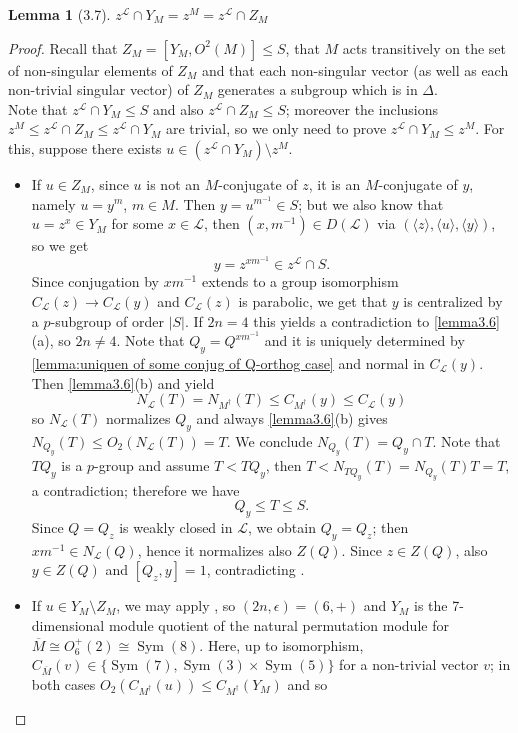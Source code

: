 \documentclass{amsart}
\numberwithin{equation}{section}
\newtheorem{lemma}[equation]{Lemma}
\theoremstyle{definition}
\theoremstyle{subresult}
\theoremstyle{caseresult}
\renewcommand{\L}{\mathcal{L}}
\newcommand{\Sym}{\operatorname{Sym}}
\newcommand{\ov}{\overline}
\newcommand{\inv}{^{-1}}
\newcommand{\fto}{\longrightarrow}
\newcommand{\<}{\langle}
\renewcommand{\>}{\rangle}
\begin{document}
\begin{lemma}[3.7]\label{lemma3.7}
	$z^\L \cap Y_M = z^M = z^\L \cap Z_M$
\end{lemma}
\begin{proof}
	Recall that $Z_M=[Y_M,O^2(M)] \le S$, that $M$ acts transitively on the set of non-singular elements of $Z_M$ and that each non-singular vector (as well as each non-trivial singular vector) of $Z_M$ generates a subgroup which is in $\Delta$.\\
	Note that $z^\L \cap Y_M \le S$ and also $z^\L \cap Z_M \le S$; moreover the inclusions $z^M \le z^\L \cap Z_M \le z^\L \cap Y_M$ are trivial, so we only need to prove $z^\L \cap Y_M \le z^M$. For this, suppose there exists $u \in (z^\L \cap Y_M) \setminus z^M$.
	\begin{itemize}
		\item If $u \in Z_M$, since $u$ is not an $M$-conjugate of $z$, it is an $M$-conjugate of $y$, namely $u=y^m$, $m \in M$. Then $y = u^{m\inv} \in S$; but we also know that $u=z^x \in Y_M$ for some $x \in \L$, then $(x,m\inv) \in D(\L)$ via $(\< z\>, \< u \>, \<y \>)$, so we get
		\[
		y = z^{xm\inv} \in z^{\L} \cap S.
		\]
		Since conjugation by $xm\inv$ extends to a group isomorphism $C_\L(z) \fto C_\L(y)$ and $C_\L(z)$ is parabolic, we get that $y$ is centralized by a $p$-subgroup of order $|S|$. If $2n=4$ this yields a contradiction to \ref{lemma3.6}(a), so $2n \ne 4$. Note that $Q_y = Q^{xm\inv}$ and it is uniquely determined by \ref{lemma:uniquen of some conjug of Q-orthog case} and normal in $C_\L(y)$. Then \ref{lemma3.6}(b) and \cite[Lemma 3.4(e)]{Meier-Stell-Stroth:2012} yield
		\[
		N_\L(T)= N_{M^\dagger}(T) \le C_{M^\dagger}(y) \le C_{\L}(y)
		\]
		so $N_\L(T)$ normalizes $Q_y$ and always \ref{lemma3.6}(b) gives $N_{Q_y}(T) \le O_2(N_\L(T)) = T$. We conclude $N_{Q_y}(T) = Q_y \cap T$. Note that $TQ_y$ is a $p$-group and assume $T < TQ_y$, then $T < N_{TQ_y}(T) = N_{Q_y}(T)T =T$, a contradiction; therefore we have
		\[
		Q_y \le T \le S.
		\]
		Since $Q=Q_z$ is weakly closed in $\L$, we obtain $Q_y=Q_z$; then $xm\inv \in N_\L(Q)$, hence it normalizes also $Z(Q)$. Since $z \in Z(Q)$, also $y \in Z(Q)$ and $[Q_z,y]=1$, contradicting \cite[Lemma 3.4(a)]{Meier-Stell-Stroth:2012}.\\
		\item If $u \in Y_M \setminus Z_M$, we may apply \cite[Lemma 3.3(f)]{Meier-Stell-Stroth:2012}, so $(2n,\epsilon) = (6,+)$ and $Y_M$ is the 7-dimensional module quotient of the natural permutation module for $\ov{M} \cong O^+_6(2) \cong \Sym(8)$. Here, up to isomorphism, $C_{\ov{M}}(v) \in \{ \Sym(7), \Sym(3) \times \Sym(5) \}$ for a non-trivial vector $v$; in both cases $O_2(C_{M^\dagger}(u)) \le C_{M^\dagger}(Y_M)$ and so

\end{itemize}
\end{proof}
\end{document}
